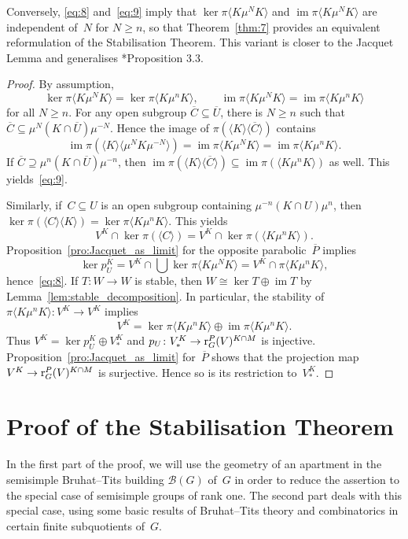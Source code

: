 \documentclass{amsart}
\theoremstyle{remark}
\theoremstyle{definition}
\DeclareMathOperator{\im}{im}%
\newcommand*{\Jacr}{\textup r}%
\newcommand*{\idem}[1]{\langle#1\rangle}%
\newcommand*{\opp}[1]{\overline{#1}}%
\newcommand*{\Op}{T}%
\newcommand{\bt}{\mathcal B(G)}%
\begin{document}
Conversely, \eqref{eq:8} and~\eqref{eq:9} imply that \(\ker \pi\idem{K\mu^NK}\) and \(\im \pi\idem{K\mu^NK}\) are independent of~\(N\) for \(N\ge n\), so that Theorem~\ref{thm:7} provides an equivalent reformulation of the Stabilisation Theorem.  This variant is closer to the Jacquet Lemma and generalises \cite{Casselman:Characters_Jacquet}*{Proposition 3.3}.

\begin{proof}
  By assumption,
  \[
  \ker \pi\idem{K \mu^N K}
  = \ker \pi\idem{K\mu^n K},\qquad
  \im \pi\idem{K\mu^N K}
  = \im \pi\idem{K \mu^nK}
  \]
  for all \(N\ge n\).  For any open subgroup \(\opp{C}\subseteq\opp{U}\), there is \(N\ge n\) such that \(\opp{C} \subseteq \mu^N (K\cap \opp{U}) \mu^{-N}\).  Hence the image of \(\pi(\idem{K}\idem{\opp{C}})\) contains
  \[
  \im \pi(\idem{K} \idem{\mu^N K \mu^{-N}})
  = \im \pi \idem{K \mu^N K}
  = \im \pi\idem{K\mu^n K}.
  \]
  If \(\opp{C} \supseteq \mu^n (K\cap \opp{U}) \mu^{-n}\), then \(\im \pi(\idem{K}\idem{\opp{C}}) \subseteq \im \pi(\idem{K \mu^n K})\) as well.  This yields~\eqref{eq:9}.

  Similarly, if~\(C\subseteq U\) is an open subgroup containing \(\mu^{-n} (K\cap U)\mu^n\), then \(\ker \pi(\idem{C} \idem{K}) = \ker \pi\idem{K\mu^nK}\).  This yields
  \[
  V^K \cap \ker \pi (\idem{C})
  = V^K \cap \ker \pi(\idem{K\mu^n K}).
  \]
  Proposition~\ref{pro:Jacquet_as_limit} for the opposite parabolic~\(\opp{P}\) implies
  \[
  \ker p_U^K
  = V^K\cap \bigcup \ker \pi\idem{K\mu^N K}
  = V^K \cap \pi\idem{K\mu^nK},
  \]
  hence~\eqref{eq:8}.  If \(\Op\colon W\to W\) is stable, then \(W\cong \ker \Op\oplus \im \Op\) by Lemma~\ref{lem:stable_decomposition}.  In particular, the stability of \(\pi\idem{K \mu^n K}\colon V^K\to V^K\) implies
  \[
  V^K = \ker \pi\idem{K \mu^n K} \oplus
  \im \pi\idem{K \mu^n K}.
  \]
  Thus \(V^K = \ker p_U^K \oplus V_*^K\) and \(p_U\colon V_*^K \to \Jacr_G^P(V)^{K \cap M}\) is injective.  Proposition~\ref{pro:Jacquet_as_limit} for~\(\opp{P}\) shows that the projection map \(V^K \to \Jacr_G^P(V)^{K \cap M}\) is surjective.  Hence so is its restriction to~\(V_*^K\).
\end{proof}


\section{Proof of the Stabilisation Theorem}
\label{sec:stabilisation}

In the first part of the proof, we will use the geometry of an apartment in the semisimple Bruhat--Tits building \(\bt\) of~\(G\) in order to reduce the assertion to the special case of semisimple groups of rank one.  The second part deals with this special case, using some basic results of Bruhat--Tits theory and combinatorics in certain finite subquotients of~\(G\).
\end{document}

